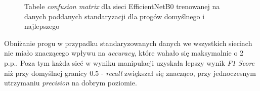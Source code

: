 \documentclass[polish,12pt]{aghthesis}
\begin{document}
\begin{figure}[H]
    \begin{adjustbox}{minipage=1.0\paperwidth, pagecenter}
    \centering
    \qquad
    \end{adjustbox}
    \label{fig:effnetb0-sth-thresh-matrices}
    \caption{Tabele \textit{confusion matrix} dla sieci EfficientNetB0 trenowanej na danych poddanych standaryzacji dla progów domyślnego i najlepszego}
\end{figure}

Obniżanie progu w przypadku standaryzowanych danych we wszystkich sieciach nie miało znaczącego wpływu na \textit{accuracy}, które wahało się maksymalnie o 2 p.p.. Poza tym każda sieć w wyniku manipulacji uzyskała lepszy wynik \textit{F1 Score} niż przy domyślnej granicy 0.5 - \textit{recall} zwiększał się znacząco, przy jednoczesnym utrzymaniu \textit{precision} na dobrym poziomie. 
\end{document}
